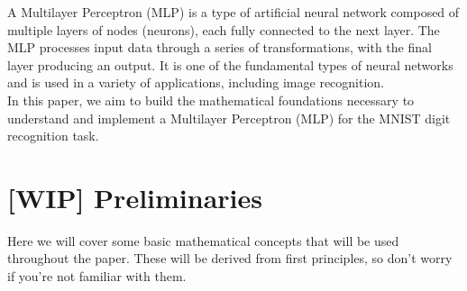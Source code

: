 \documentclass[9pt]{extarticle}
\theoremstyle{plain}
\theoremstyle{definition}
\theoremstyle{remark}
\begin{document}
\vspace{0.4cm}
\noindent A Multilayer Perceptron (MLP) is a type of artificial neural network composed of multiple
layers of nodes (neurons), each fully connected to the next layer. The MLP processes input data through
a series of transformations, with the final layer producing an output. It is one of the fundamental types
of neural networks and is used in a variety of applications, including image recognition. \\[2ex]
In this paper, we aim to build the mathematical foundations necessary to understand and implement a
Multilayer Perceptron (MLP) for the MNIST digit recognition task.

\pagebreak

\tableofcontents

\pagebreak
\section*{[WIP] Preliminaries}
Here we will cover some basic mathematical concepts that will be used throughout the paper. These will be derived from first principles, so don't worry if you're not familiar with them.
\end{document}
